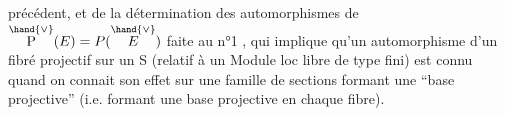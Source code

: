 
précédent, et de la détermination des automorphismes de $\overset{\hand{\vee}}{\mathrm{P}}(E) = P(\overset{\hand{\vee}}{E})$ faite
au n°1 , qui implique qu'un automorphisme d'un fibré projectif sur un S
(relatif à un Module loc libre de type fini)  est connu quand on connait
son effet sur une famille de sections formant une ``base projective''
(i.e. formant une base projective en chaque  fibre).

